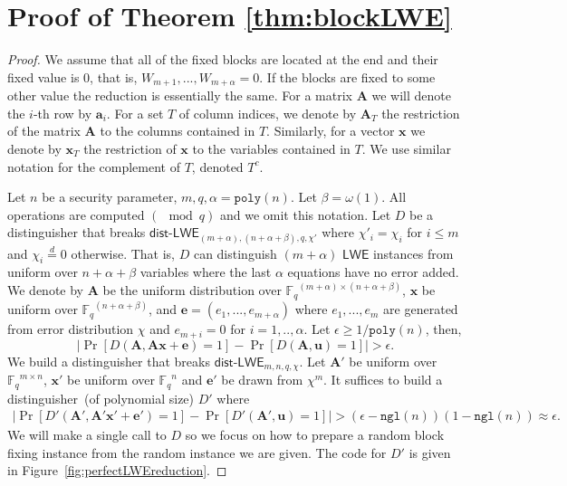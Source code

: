 \documentclass[11pt]{article}
\newcommand{\figref}[1]{\mbox{Figure~\ref{#1}}}
\newcommand{\class}[1]{{\ensuremath{\mathsf{#1}}}}
\newcommand{\vect}[1]{\ensuremath{\textbf{#1}}}
\newcommand{\Fq}{\ensuremath{\mathbb{F}_q}}
\newcommand{\poly}{\ensuremath{\mathtt{poly}}\xspace}
\newcommand{\ngl}{\ensuremath{\mathtt{ngl}}\xspace}
\newcommand{\LWE}{\class{LWE}}
\newcommand{\distLWE}{\ensuremath{\class{dist\mbox{-}LWE}}}
\newcommand{\authnote}[2]{{\textcolor{red}{\textsf{#1 notes: }\textcolor{blue}{ #2}}\marginpar{\textcolor{red}{\textbf{!!!!!}}}}}
\newcommand{\authnote}[2]{}
\newcommand{\bnote}[1]{{\authnote{Ben}{#1}}}
\newcommand{\lnote}[1]{{\authnote{Leo}{#1}}}
\newcommand{\ve}{\vect{e}}
\newcommand{\vA}{\vect{A}}
\newcommand{\vx}{\vect{x}}
\newcommand{\va}{\vect{a}}
\newcommand{\vu}{\vect{u}}
\begin{document}
\section{Proof of Theorem \ref{thm:blockLWE}}
\label{sec:proof of block theorem}

\begin{proof}
We assume that all of the fixed blocks are located at the end and their fixed value is $0$, that is, $W_{m+1}, ..., W_{m+\alpha} =0$.  If the blocks are fixed to some other value the reduction is essentially the same.  For a matrix $\vA$ we will denote the $i$-th row by $\va_i$.  For a set $T$ of column indices, we denote by $\vA_T$ the restriction of the matrix $\vA$ to the columns contained in $T$.  Similarly, for a vector $\vx$ we denote by $\vx_T$ the restriction of $\vx$ to the variables contained in $T$.  We use similar notation for the complement of $T$, denoted $T^c$.


Let $n$ be a security parameter, $m ,q , \alpha= \poly(n)$.  Let $\beta = \omega(1)$.  All operations are computed $(\mod q)$ and we omit this notation.  
Let $D$ be a distinguisher that breaks $\distLWE_{(m+\alpha), (n+\alpha+\beta), q, \chi'}$ where $\chi'_i = \chi_i$ for $i\leq m$ and $\chi_i \overset{d}= 0$ otherwise.  That is, $D$ can distinguish $(m+\alpha)$ $\LWE$ instances from uniform over $n+\alpha+\beta$ variables where the last $\alpha$ equations have no error added.  We denote by $\vA$ be the uniform distribution over $\Fq^{(m+\alpha)\times(n+\alpha+\beta)}$, $\vx$ be uniform over $\Fq^{(n+\alpha+\beta)}$, and $\ve= (e_1,..., e_{m+\alpha})$ where $e_1,..., e_m$ are generated from error distribution $\chi$ and $e_{m+i} =0$ for $i=1,..,\alpha$. Let $\epsilon \geq 1/\poly(n)$, then, 
\[
|\Pr[D(\vA, \vA\vx+\ve) = 1] - \Pr[D(\vA, \vu) =1]|> \epsilon.
\]
We build a distinguisher that breaks $\distLWE_{m, n, q, \chi}$.  Let $\vA'$ be uniform over $\Fq^{m\times n}$, $\vx'$ be uniform over $\Fq^n$ and $\ve'$ be drawn from $\chi^m$.  It suffices to build a distinguisher~(of polynomial size) $D'$  where 
\begin{align}
\label{eq:block LWE dist}
|\Pr[D'(\vA', \vA'\vx'+\ve') = 1] - \Pr[D'(\vA', \vu) =1]|> (\epsilon - \ngl(n))(1-\ngl(n)) \approx \epsilon.
\end{align}
We will make a single call to $D$ so we focus on how to prepare a random block fixing instance from the random instance we are given.  The code for $D'$ is given in \figref{fig:perfectLWEreduction}.


\end{proof}
\end{document}
